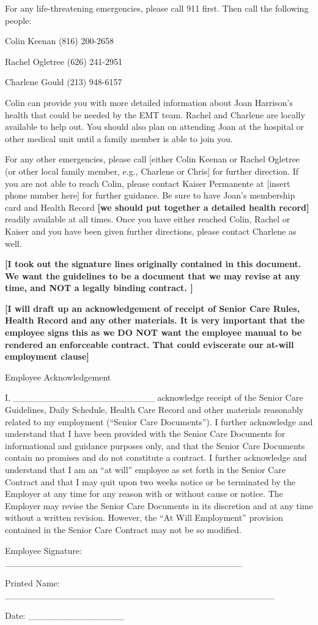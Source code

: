 \documentclass[]{article}
\begin{document}
For any life-threatening emergencies, please call 911 first. Then call
the following people:

Colin Keenan (816) 200-2658

Rachel Ogletree (626) 241-2951

Charlene Gould (213) 948-6157

Colin can provide you with more detailed information about Joan
Harrison's health that could be needed by the EMT team. Rachel and
Charlene are locally available to help out. You should also plan on
attending Joan at the hospital or other medical unit until a family
member is able to join you.

For any other emergencies, please call {[}either Colin Keenan or Rachel
Ogletree (or other local family member, e.g., Charlene or Chris{]} for
further direction. If you are not able to reach Colin, please contact
Kaiser Permanente at {[}insert phone number here{]} for further
guidance. Be sure to have Joan's membership card and Health Record
\textbf{{[}we should put together a detailed health record{]}} readily
available at all times. Once you have either reached Colin, Rachel or
Kaiser and you have been given further directions, please contact
Charlene as well.

\textbf{{[}I took out the signature lines originally contained in this
document. We want the guidelines to be a document that we may revise at
any time, and NOT a legally binding contract. {]}\\}

\textbf{{[}I will draft up an acknowledgement of receipt of Senior Care
Rules, Health Record and any other materials. It is very important that
the employee signs this as we DO NOT want the employee manual to be
rendered an enforceable contract. That could eviscerate our at-will
employment clause{]} }

Employee Acknowledgement

I, \_\_\_\_\_\_\_\_\_\_\_\_\_\_\_\_\_\_\_\_\_\_ acknowledge receipt of
the Senior Care Guidelines, Daily Schedule, Health Care Record and other
materials reasonably related to my employment (``Senior Care
Documents''). I further acknowledge and understand that I have been
provided with the Senior Care Documents for informational and guidance
purposes only, and that the Senior Care Documents contain no promises
and do not constitute a contract. I further acknowledge and understand
that I am an ``at will'' employee as set forth in the Senior Care
Contract and that I may quit upon two weeks notice or be terminated by
the Employer at any time for any reason with or without cause or notice.
The Employer may revise the Senior Care Documents in its discretion and
at any time without a written revision. However, the ``At Will
Employment'' provision contained in the Senior Care Contract may not be
so modified.

Employee Signature:
\_\_\_\_\_\_\_\_\_\_\_\_\_\_\_\_\_\_\_\_\_\_\_\_\_\_\_\_\_\_\_\_\_\_\_\_\_

Printed Name:
\_\_\_\_\_\_\_\_\_\_\_\_\_\_\_\_\_\_\_\_\_\_\_\_\_\_\_\_\_\_\_\_\_\_\_\_\_\_\_\_\_\_

Date: \_\_\_\_\_\_\_\_\_\_\_\_\_\_\_
\end{document}
